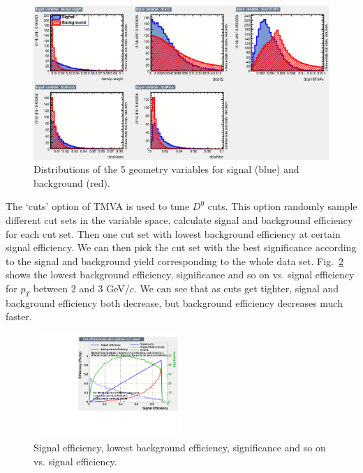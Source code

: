 \documentclass[a4paper]{article}
\begin{document}
\begin{figure}[htbp]
\centering
\includegraphics[keepaspectratio,width=1.0\textwidth]{fig/variables_id_c1.eps}
\caption{Distributions of the 5 geometry variables for signal (blue) and background (red).}
\label{fig:variables}
\end{figure}

The `cuts' option of TMVA is used to tune $D^0$ cuts. This option randomly sample different cut sets in the variable space, calculate signal and background efficiency for each cut set. Then one cut set with lowest background efficiency at certain signal efficiency. We can then pick the cut set with the best significance according to the signal and background yield corresponding to the whole data set. Fig.~\ref{fig:effPass4} shows the lowest background efficiency, significance and so on vs. signal efficiency for $p_T$ between 2 and 3 GeV/$c$. We can see that as cuts get tighter, signal and background efficiency both decrease, but background efficiency decreases much faster.

\begin{figure}[htbp]
\centering
\includegraphics[keepaspectratio,width=0.5\textwidth,angle=0]{fig/effPass4.pdf}
\caption{Signal efficiency, lowest background efficiency, significance and so on vs. signal efficiency.}
\label{fig:effPass4}
\end{figure}
\end{document}
